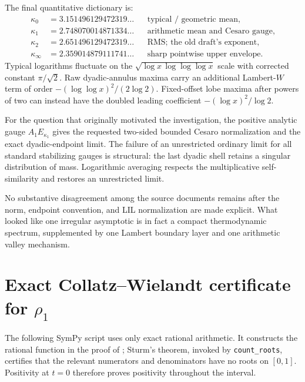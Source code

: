 \documentclass[11pt,oneside]{article}
\theoremstyle{definition}
\theoremstyle{remark}
\begin{document}
The final quantitative dictionary is:
\begin{align*}
 \kappa_0&=3.151496129472319\ldots &&\text{typical / geometric mean},\\
 \kappa_1&=2.748070014871334\ldots &&\text{arithmetic mean and Cesaro gauge},\\
 \kappa_2&=2.651496129472319\ldots &&\text{RMS; the old draft's exponent},\\
 \kappa_\infty&=2.359014879111741\ldots &&\text{sharp pointwise upper envelope}.
\end{align*}
Typical logarithms fluctuate on the
$\sqrt{\log x\,\log\log\log x}$ scale with corrected constant $\pi/\sqrt2$.
Raw dyadic-annulus maxima carry an additional Lambert-$W$ term of order
$-(\log\log x)^2/(2\log2)$.  Fixed-offset lobe maxima after powers of two can instead have
the doubled leading coefficient $-(\log x)^2/\log2$.

For the question that originally motivated the investigation, the positive analytic gauge
$A_1E_{\kappa_1}$ gives the requested two-sided bounded Cesaro normalization and the exact
dyadic-endpoint limit.  The failure of an unrestricted ordinary limit for all standard
stabilizing gauges is structural: the last dyadic shell retains a singular distribution of
mass.  Logarithmic averaging respects the multiplicative self-similarity and restores an
unrestricted limit.

No substantive disagreement among the source documents remains after the norm, endpoint
convention, and LIL normalization are made explicit.  What looked like one irregular
asymptotic is in fact a compact thermodynamic spectrum, supplemented by one Lambert boundary
layer and one arithmetic valley mechanism.

\appendix

\section{Exact Collatz--Wielandt certificate for \texorpdfstring{$\rho_1$}{rho1}}
\label{app:certificate}

The following SymPy script uses only exact rational arithmetic.  It constructs the rational
function in the proof of ; Sturm's theorem, invoked by
\texttt{count\_roots}, certifies that the relevant numerators and denominators have no roots
on $[0,1]$.  Positivity at $t=0$ therefore proves positivity throughout the interval.
\end{document}
